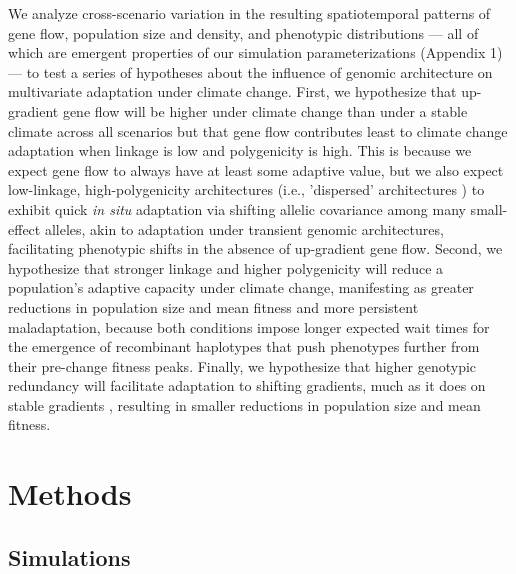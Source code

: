 \documentclass[9pt,twocolumn,twoside,lineno]{new_article}
\begin{document}
We analyze cross-scenario variation in the resulting spatiotemporal
patterns of gene flow, population size and density, and phenotypic
distributions --- all of which are emergent properties of our simulation
parameterizations (Appendix 1) --- 
to test a series of hypotheses about the influence of genomic architecture 
on multivariate adaptation under climate change. First, we hypothesize that up-gradient 
gene flow will be higher under climate change than under a stable climate across all
scenarios but that gene flow contributes least to climate change adaptation when
linkage is low and polygenicity is high.
This is because we expect gene flow to always have
at least some adaptive value, but we also expect low-linkage, high-polygenicity architectures 
(i.e., 'dispersed' architectures \cite{yeaman_review}) to exhibit quick \textit{in situ}
adaptation via shifting allelic covariance among many small-effect alleles, akin to adaptation 
under transient genomic architectures, facilitating phenotypic shifts in the absence of up-gradient gene flow.
Second, we hypothesize that stronger linkage 
and higher polygenicity will reduce a population's adaptive capacity under climate change,
manifesting as greater reductions in population size and mean fitness
and more persistent maladaptation, because both conditions impose longer expected
wait times for the emergence of recombinant haplotypes that push phenotypes
further from their pre-change fitness peaks. Finally, we hypothesize that higher genotypic redundancy
will facilitate adaptation to shifting gradients, much as it does on stable gradients 
\cite{barghi_redundancy,manceau,yeaman_amnat}, resulting in smaller reductions 
in population size and mean fitness.


\section*{Methods}

\subsection*{Simulations}
\end{document}
